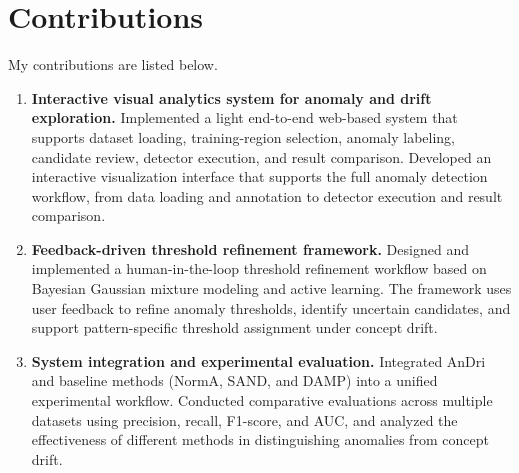 \section{Contributions}

My contributions are listed below.

\begin{enumerate}

\item \textbf{Interactive visual analytics system for anomaly and drift exploration.}
Implemented a light end-to-end web-based system that supports dataset loading, training-region selection, anomaly labeling, candidate review, detector execution, and result comparison. Developed an interactive visualization interface that supports the full anomaly detection workflow, from data loading and annotation to detector execution and result comparison.

\item \textbf{Feedback-driven threshold refinement framework.}
Designed and implemented a human-in-the-loop threshold refinement workflow based on Bayesian Gaussian mixture modeling and active learning. The framework uses user feedback to refine anomaly thresholds, identify uncertain candidates, and support pattern-specific threshold assignment under concept drift.

\item \textbf{System integration and experimental evaluation.}
Integrated AnDri and baseline methods (NormA, SAND, and DAMP)  into a unified experimental workflow. Conducted comparative evaluations across multiple datasets using precision, recall, F1-score, and AUC, and analyzed the effectiveness of different methods in distinguishing anomalies from concept drift.  


\end{enumerate}


